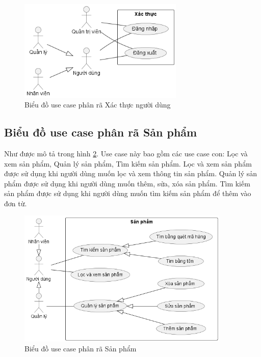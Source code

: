 \documentclass[../DoAn.tex]{subfiles}
\begin{document}
\begin{figure}[H]
    \centering
    \includegraphics[width=0.7\textwidth]{Hinhve/usecases/Authentication}
    \caption{Biểu đồ use case phân rã Xác thực người dùng}
    \label{fig:uc-authentication}
\end{figure}


\subsection{Biểu đồ use case phân rã Sản phẩm}
\label{subsection:uc-product}
Như được mô tả trong hình \ref{fig:uc-product}. Use case này bao gồm các use case con: Lọc và xem sản phẩm, Quản lý sản phẩm, Tìm kiếm sản phẩm. Lọc và xem sản phẩm được sử dụng khi người dùng muốn lọc và xem thông tin sản phẩm. Quản lý sản phẩm được sử dụng khi người dùng muốn thêm, sửa, xóa sản phẩm. Tìm kiếm sản phẩm được sử dụng khi người dùng muốn tìm kiếm sản phẩm để thêm vào đơn từ.

\begin{figure}[H]
    \centering
    \includegraphics[width=0.9\textwidth]{Hinhve/usecases/Product}
    \caption{Biểu đồ use case phân rã Sản phẩm}
    \label{fig:uc-product}
\end{figure}
\end{document}
